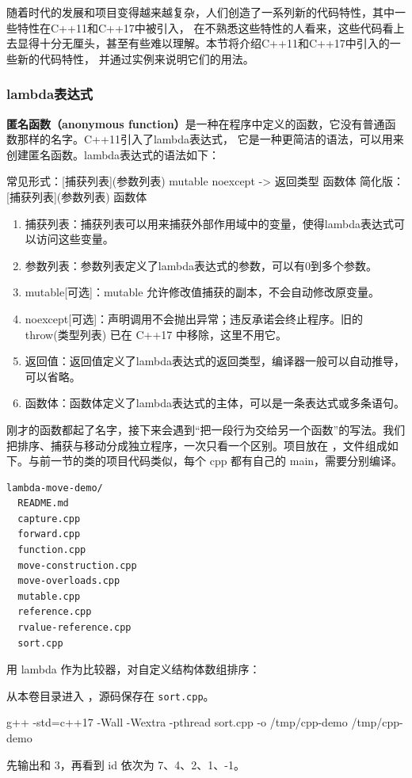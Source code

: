随着时代的发展和项目变得越来越复杂，人们创造了一系列新的代码特性，其中一些特性在C++11和C++17中被引入，
在不熟悉这些特性的人看来，这些代码看上去显得十分无厘头，甚至有些难以理解。本节将介绍C++11和C++17中引入的一些新的代码特性，
并通过实例来说明它们的用法。

\subsubsection{lambda表达式}

\textbf{匿名函数（anonymous function）}是一种在程序中定义的函数，它没有普通函数那样的名字。C++11引入了lambda表达式，
它是一种更简洁的语法，可以用来创建匿名函数。lambda表达式的语法如下：

\begin{tcode}
常见形式：[捕获列表](参数列表) mutable noexcept -> 返回类型 {函数体}
简化版：[捕获列表](参数列表) {函数体}
\end{tcode}

\begin{enumerate}
    \item 捕获列表：捕获列表可以用来捕获外部作用域中的变量，使得lambda表达式可以访问这些变量。
    \item 参数列表：参数列表定义了lambda表达式的参数，可以有0到多个参数。
    \item mutable[可选]：mutable 允许修改值捕获的副本，不会自动修改原变量。
    \item noexcept[可选]：声明调用不会抛出异常；违反承诺会终止程序。旧的 throw(类型列表) 已在 C++17 中移除，这里不用它。
    \item 返回值：返回值定义了lambda表达式的返回类型，编译器一般可以自动推导，可以省略。
    \item 函数体：函数体定义了lambda表达式的主体，可以是一条表达式或多条语句。
\end{enumerate}

刚才的函数都起了名字，接下来会遇到“把一段行为交给另一个函数”的写法。我们把排序、捕获与移动分成独立程序，一次只看一个区别。项目放在 ，文件组成如下。与前一节的类的项目代码类似，每个 cpp 都有自己的 main，需要分别编译。
\begin{lstlisting}[language={}]
lambda-move-demo/
  README.md
  capture.cpp
  forward.cpp
  function.cpp
  move-construction.cpp
  move-overloads.cpp
  mutable.cpp
  reference.cpp
  rvalue-reference.cpp
  sort.cpp
\end{lstlisting}

\begin{example}
用 lambda 作为比较器，对自定义结构体数组排序：



从本卷目录进入 ，源码保存在 \texttt{sort.cpp}。
\begin{tbash}
g++ -std=c++17 -Wall -Wextra -pthread sort.cpp -o /tmp/cpp-demo
/tmp/cpp-demo
\end{tbash}
先输出和 3，再看到 id 依次为 7、4、2、1、-1。
\end{example}

